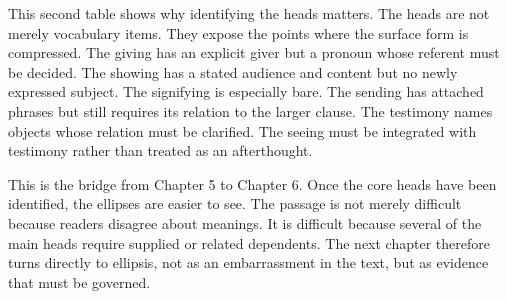 This second table shows why identifying the heads matters. The heads are not merely vocabulary items. They expose the points where the surface form is compressed. The giving has an explicit giver but a pronoun whose referent must be decided. The showing has a stated audience and content but no newly expressed subject. The signifying is especially bare. The sending has attached phrases but still requires its relation to the larger clause. The testimony names objects whose relation must be clarified. The seeing must be integrated with testimony rather than treated as an afterthought.

This is the bridge from Chapter 5 to Chapter 6. Once the core heads have been identified, the ellipses are easier to see. The passage is not merely difficult because readers disagree about meanings. It is difficult because several of the main heads require supplied or related dependents. The next chapter therefore turns directly to ellipsis, not as an embarrassment in the text, but as evidence that must be governed.
